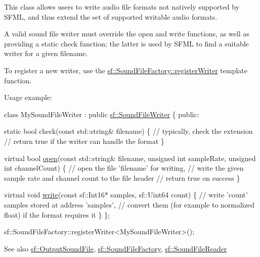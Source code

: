 This class allows users to write audio file formats not natively supported by S\+F\+ML, and thus extend the set of supported writable audio formats.

A valid sound file writer must override the open and write functions, as well as providing a static check function; the latter is used by S\+F\+ML to find a suitable writer for a given filename.

To register a new writer, use the \hyperlink{classsf_1_1_sound_file_factory_a3a59140e6ccf1f252f721b790eddd661}{sf\+::\+Sound\+File\+Factory\+::register\+Writer} template function.

Usage example\+: 
\begin{DoxyCode}
\textcolor{keyword}{class }MySoundFileWriter : \textcolor{keyword}{public} \hyperlink{classsf_1_1_sound_file_writer}{sf::SoundFileWriter}
\{
\textcolor{keyword}{public}:

    \textcolor{keyword}{static} \textcolor{keywordtype}{bool} check(\textcolor{keyword}{const} std::string& filename)
    \{
        \textcolor{comment}{// typically, check the extension}
        \textcolor{comment}{// return true if the writer can handle the format}
    \}

    \textcolor{keyword}{virtual} \textcolor{keywordtype}{bool} \hyperlink{classsf_1_1_sound_file_writer_a5c92bcaaa880ef4d3eaab18dae1d3d07}{open}(\textcolor{keyword}{const} std::string& filename, \textcolor{keywordtype}{unsigned} \textcolor{keywordtype}{int} sampleRate, \textcolor{keywordtype}{unsigned} \textcolor{keywordtype}{int} channelCount)
    \{
        \textcolor{comment}{// open the file 'filename' for writing,}
        \textcolor{comment}{// write the given sample rate and channel count to the file header}
        \textcolor{comment}{// return true on success}
    \}

    \textcolor{keyword}{virtual} \textcolor{keywordtype}{void} \hyperlink{classsf_1_1_sound_file_writer_a4ce597e7682d22c5b2c98d77e931a1da}{write}(\textcolor{keyword}{const} sf::Int16* samples, sf::Uint64 count)
    \{
        \textcolor{comment}{// write 'count' samples stored at address 'samples',}
        \textcolor{comment}{// convert them (for example to normalized float) if the format requires it}
    \}
\};

sf::SoundFileFactory::registerWriter<MySoundFileWriter>();
\end{DoxyCode}


\begin{DoxySeeAlso}{See also}
\hyperlink{classsf_1_1_output_sound_file}{sf\+::\+Output\+Sound\+File}, \hyperlink{classsf_1_1_sound_file_factory}{sf\+::\+Sound\+File\+Factory}, \hyperlink{classsf_1_1_sound_file_reader}{sf\+::\+Sound\+File\+Reader} 
\end{DoxySeeAlso}



